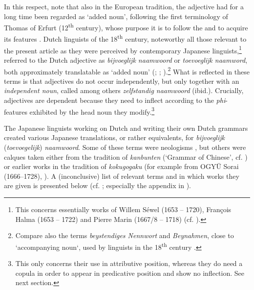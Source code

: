 \documentclass[output=paper,colorlinks,citecolor=brown]{langscibook}
\begin{document}
In this respect, note that also in the European tradition, the adjective had for a long time been regarded as \emph{} `added noun', following the first terminology of Thomas of Erfurt (12\textsuperscript{th} century), whose purpose it is to follow the \emph{} and to acquire its features \citep{hajek2004}. Dutch linguists of the 18\textsuperscript{th} century, noteworthy all those relevant to the present article as they were perceived by contemporary Japanese linguists,\footnote{This concerns essentially works of Willem Séwel (1653 -- 1720), François Halma (1653 -- 1722) and Pierre Marin (1667/8 -- 1718) (cf. \citealt{nespoli2023}).} referred to the Dutch adjective as \emph{bijvoeglijk naamwoord} or \emph{toevoeglijk naamword}, both approximately translatable as `added noun' (\citealt[624]{sugimoto1991}; \citealt[128]{kim2006}; \citealt{nespoli2023}).\footnote{Compare also the  terms \emph{beystendiges Nennwort} and \emph{Beynahmen}, close to `accompanying noun`, used by  linguists in the 18\textsuperscript{th} century \citep[1--5]{spitzl-dupic2011}.} What is reflected in these terms is that adjectives do not occur independently, but only together with an \emph{independent noun}, called among others \emph{zelfstandig naamwoord} (ibid.). Crucially, adjectives are dependent because they need to inflect according to the \emph{phi}-features exhibited by the head noun they modify.\footnote{This only concerns their use in attributive position, whereas they do need a copula in order to appear in predicative position and show no inflection. See next section.}

The Japanese linguists working on Dutch and writing their own Dutch grammars created various Japanese translations, or rather equivalents, for \emph{bijvoeglijk} (\emph{toevoegelijk}) \emph{naamwoord}. Some of these terms were neologisms \citep{kim2006, sugimoto1991}, but others were calques taken either from the tradition of \emph{kanbunten} (`Grammar of Chinese', cf. \citealt[44--45]{sugimoto1991}) or earlier works in the tradition of \emph{kokugogaku} (for example from OGYŪ Sorai (1666--1728), \citealt[395--399]{nespoli2023}). A (inconclusive) list of relevant terms and in which works they are given is presented below (cf. \citealt[188]{kohlich2020}; especially the appendix in \citealt{sugimoto1991}).
\end{document}
